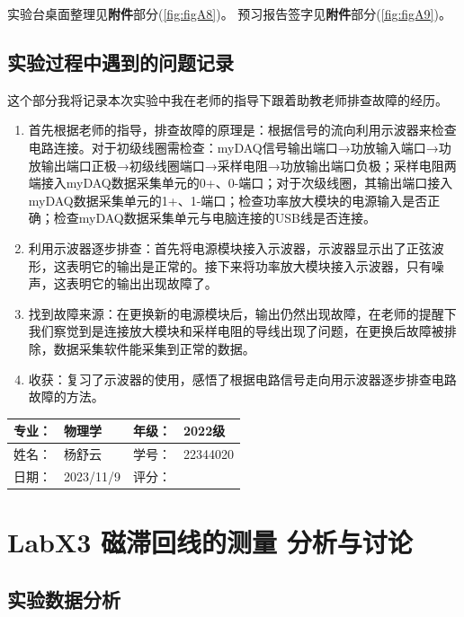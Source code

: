 \documentclass[dvipsnames, svgnames,a4paper,11pt]{article}
\begin{document}
	实验台桌面整理见\textbf{附件}部分(\cref{fig:figA8})。
	预习报告签字见\textbf{附件}部分(\cref{fig:figA9})。
	
	\subsection{实验过程中遇到的问题记录}
	这个部分我将记录本次实验中我在老师的指导下跟着助教老师排查故障的经历。
	\begin{enumerate}
		\item 首先根据老师的指导，排查故障的原理是：根据信号的流向利用示波器来检查电路连接。对于初级线圈需检查：myDAQ信号输出端口→功放输入端口→功放输出端口正极→初级线圈端口→采样电阻→功放输出端口负极；采样电阻两端接入myDAQ数据采集单元的0+、0-端口；对于次级线圈，其输出端口接入myDAQ数据采集单元的1+、1-端口；检查功率放大模块的电源输入是否正确；检查myDAQ数据采集单元与电脑连接的USB线是否连接。
		\item 利用示波器逐步排查：首先将电源模块接入示波器，示波器显示出了正弦波形，这表明它的输出是正常的。接下来将功率放大模块接入示波器，只有噪声，这表明它的输出出现故障了。
		\item 找到故障来源：在更换新的电源模块后，输出仍然出现故障，在老师的提醒下我们察觉到是连接放大模块和采样电阻的导线出现了问题，在更换后故障被排除，数据采集软件能采集到正常的数据。
		\item 收获：复习了示波器的使用，感悟了根据电路信号走向用示波器逐步排查电路故障的方法。
	\end{enumerate}
	
	
	
	\clearpage
	\begin{table}
		\renewcommand\arraystretch{1.7}
		\begin{tabularx}{\textwidth}{|X|X|X|X|}
			\hline
			专业：& 物理学 &年级：& 2022级\\
			\hline
			姓名： & 杨舒云 & 学号：& 22344020\\
			\hline
			日期：& 2023/11/9 & 评分： &\\
			\hline
		\end{tabularx}
	\end{table}
	
	\section{LabX3 磁滞回线的测量 \quad\heiti 分析与讨论}
	\subsection{实验数据分析}
\end{document}

